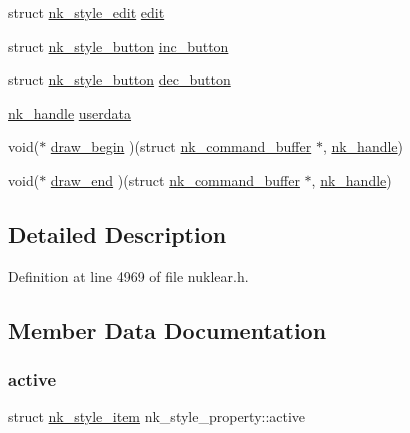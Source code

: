\begin{DoxyCompactItemize}
\item 
struct \mbox{\hyperlink{structnk__style__edit}{nk\+\_\+style\+\_\+edit}} \mbox{\hyperlink{structnk__style__property_a535d43c8849cb49b3ec2fcd959512c60}{edit}}
\item 
struct \mbox{\hyperlink{structnk__style__button}{nk\+\_\+style\+\_\+button}} \mbox{\hyperlink{structnk__style__property_aee8c9b461e7959b29108e1510d95cc09}{inc\+\_\+button}}
\item 
struct \mbox{\hyperlink{structnk__style__button}{nk\+\_\+style\+\_\+button}} \mbox{\hyperlink{structnk__style__property_a22c87851305dcc0a9d512125c0788cb6}{dec\+\_\+button}}
\item 
\mbox{\hyperlink{unionnk__handle}{nk\+\_\+handle}} \mbox{\hyperlink{structnk__style__property_a453d9d4df7e05c98746e5fae61725a2f}{userdata}}
\item 
void($\ast$ \mbox{\hyperlink{structnk__style__property_a2aef0170ff75d320823a03b6d86b002a}{draw\+\_\+begin}} )(struct \mbox{\hyperlink{structnk__command__buffer}{nk\+\_\+command\+\_\+buffer}} $\ast$, \mbox{\hyperlink{unionnk__handle}{nk\+\_\+handle}})
\item 
void($\ast$ \mbox{\hyperlink{structnk__style__property_a58a86e4d8e78c917022bf2755d1bffa0}{draw\+\_\+end}} )(struct \mbox{\hyperlink{structnk__command__buffer}{nk\+\_\+command\+\_\+buffer}} $\ast$, \mbox{\hyperlink{unionnk__handle}{nk\+\_\+handle}})
\end{DoxyCompactItemize}


\subsection{Detailed Description}


Definition at line 4969 of file nuklear.\+h.



\subsection{Member Data Documentation}
\mbox{\label{structnk__style__property_a4e3cdf1dec9c8b281cc30244c825be04}} 
\subsubsection{\texorpdfstring{active}{active}}
{\footnotesize\ttfamily struct \mbox{\hyperlink{structnk__style__item}{nk\+\_\+style\+\_\+item}} nk\+\_\+style\+\_\+property\+::active}



